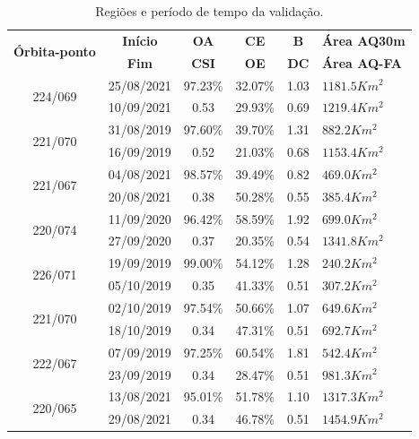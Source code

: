 \documentclass[cic,tc]{iiufrgs}
\begin{document}
\begin{table}[htbp]
\centering
\caption{Regiões e período de tempo da validação.}

\begin{tabular}{cccccl}
\toprule
 \multirow{2}{*}{\textbf{Órbita-ponto}} & \textbf{Início} & \textbf{OA}  & \textbf{CE} & \textbf{B}  & \textbf{Área AQ30m} \\
 \cline{2-6}
 \noalign{\smallskip} %
                                        & \textbf{Fim}    & \textbf{CSI} & \textbf{OE} & \textbf{DC} & \textbf{Área AQ-FA} \\
\midrule
\multirow{2}{*}{224/069} & 25/08/2021 & 97.23\% & 32.07\% & 1.03 & $1181.5Km^2$ \\
                         & 10/09/2021 & 0.53 & 29.93\% & 0.69 & $1219.4Km^2$ \\
\hline
\multirow{2}{*}{221/070} & 31/08/2019 & 97.60\% & 39.70\% & 1.31 & $882.2Km^2$ \\
                         & 16/09/2019 & 0.52 & 21.03\% & 0.68 & $1153.4Km^2$ \\
\hline
\multirow{2}{*}{221/067} & 04/08/2021 & 98.57\% & 39.49\% & 0.82 & $469.0Km^2$ \\
                         & 20/08/2021 & 0.38 & 50.28\% & 0.55 & $385.4Km^2$ \\
\hline
\multirow{2}{*}{220/074} & 11/09/2020 & 96.42\% & 58.59\% & 1.92 & $699.0Km^2$ \\
                         & 27/09/2020 & 0.37 & 20.35\% & 0.54 & $1341.8Km^2$ \\
\hline
\multirow{2}{*}{226/071} & 19/09/2019 & 99.00\% & 54.12\% & 1.28 & $240.2Km^2$ \\
                         & 05/10/2019 & 0.35 & 41.33\% & 0.51 & $307.2Km^2$ \\
\hline
\multirow{2}{*}{221/070} & 02/10/2019 & 97.54\% & 50.66\% & 1.07 & $649.6Km^2$ \\
                         & 18/10/2019 & 0.34 & 47.31\% & 0.51 & $692.7Km^2$ \\
\hline
\multirow{2}{*}{222/067} & 07/09/2019 & 97.25\% & 60.54\% & 1.81 & $542.4Km^2$ \\
                         & 23/09/2019 & 0.34 & 28.47\% & 0.51 & $981.3Km^2$ \\
\hline
\multirow{2}{*}{220/065} & 13/08/2021 & 95.01\% & 51.78\% & 1.10 & $1317.3Km^2$ \\
                         & 29/08/2021 & 0.34 & 46.78\% & 0.51 & $1454.9Km^2$ \\

\end{tabular}
\end{table}
\end{document}
